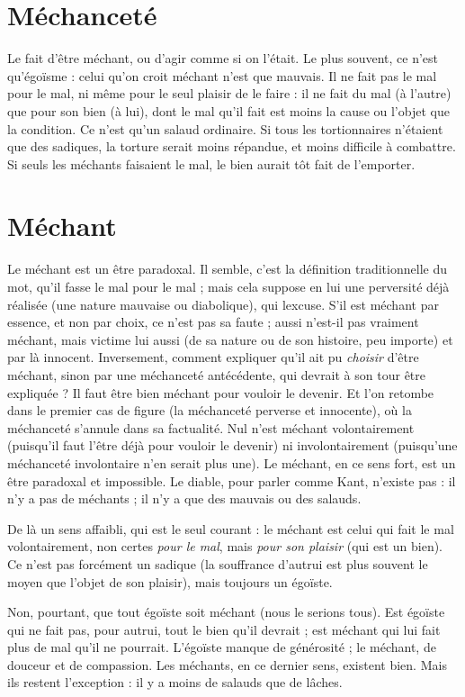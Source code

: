 \section{Méchanceté}
Le fait d’être méchant, ou d’agir comme si on l'était. Le
plus souvent, ce n’est qu’égoïsme : celui qu’on croit méchant
n’est que mauvais. Il ne fait pas le mal pour le mal, ni même pour le seul plaisir
de le faire : il ne fait du mal (à l’autre) que pour son bien (à lui), dont le mal
qu’il fait est moins la cause ou l’objet que la condition. Ce n’est qu’un salaud
ordinaire. Si tous les tortionnaires n'étaient que des sadiques, la torture serait
moins répandue, et moins difficile à combattre. Si seuls les méchants faisaient
le mal, le bien aurait tôt fait de l'emporter.

\section{Méchant}
Le méchant est un être paradoxal. Il semble, c’est la définition
traditionnelle du mot, qu’il fasse le mal pour le mal ; mais cela
suppose en lui une perversité déjà réalisée (une nature mauvaise ou diabolique),
qui lexcuse. S'il est méchant par essence, et non par choix, ce n’est pas sa
faute ; aussi n'est-il pas vraiment méchant, mais victime lui aussi (de sa nature
ou de son histoire, peu importe) et par là innocent. Inversement, comment
expliquer qu’il ait pu {\it choisir} d’être méchant, sinon par une méchanceté antécédente,
qui devrait à son tour être expliquée ? Il faut être bien méchant pour
vouloir le devenir. Et l’on retombe dans le premier cas de figure (la méchanceté
perverse et innocente), où la méchanceté s’annule dans sa factualité. Nul n’est
méchant volontairement (puisqu'il faut l’être déjà pour vouloir le devenir) ni
involontairement (puisqu’une méchanceté involontaire n’en serait plus une).
Le méchant, en ce sens fort, est un être paradoxal et impossible. Le diable, pour
parler comme Kant, n'existe pas : il n’y a pas de méchants ; il n’y a que des
mauvais ou des salauds.

De là un sens affaibli, qui est le seul courant : le méchant est celui qui fait
le mal volontairement, non certes {\it pour le mal}, mais {\it pour son plaisir} (qui est un
bien). Ce n’est pas forcément un sadique (la souffrance d’autrui est plus souvent
le moyen que l’objet de son plaisir), mais toujours un égoïste.

Non, pourtant, que tout égoïste soit méchant (nous le serions tous). Est
égoïste qui ne fait pas, pour autrui, tout le bien qu’il devrait ; est méchant qui
lui fait plus de mal qu’il ne pourrait. L’égoïste manque de générosité ; le
méchant, de douceur et de compassion. Les méchants, en ce dernier sens, existent
bien. Mais ils restent l’exception : il y a moins de salauds que de lâches.

